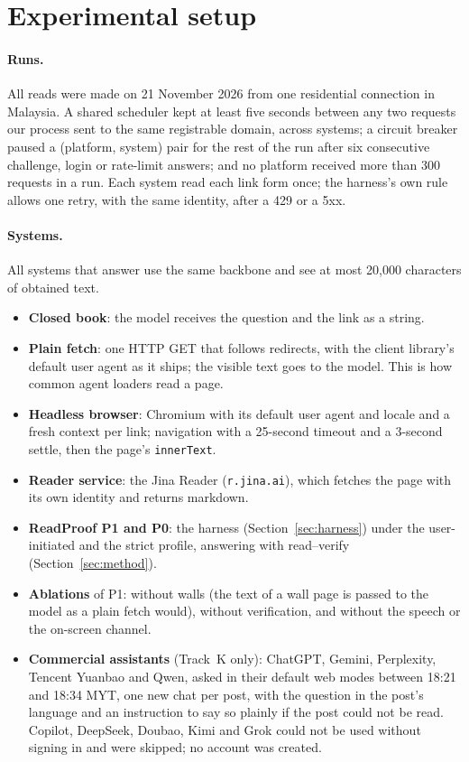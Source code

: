 \section{Experimental setup}\label{sec:setup}

\paragraph{Runs.}
All reads were made on 21 November 2026 from one residential connection in Malaysia. A shared scheduler kept at
least five seconds between any two requests our process sent to the same registrable domain, across systems; a
circuit breaker paused a (platform, system) pair for the rest of the run after six consecutive challenge, login or
rate-limit answers; and no platform received more than 300 requests in a run. Each system read each link form
once; the harness's own rule allows one retry, with the same identity, after a 429 or a 5xx.

\paragraph{Systems.}
All systems that answer use the same backbone and see at most 20{,}000 characters of obtained text.
\begin{itemize}[leftmargin=1.4em,itemsep=1pt]
\item \textbf{Closed book}: the model receives the question and the link as a string.
\item \textbf{Plain fetch}: one HTTP GET that follows redirects, with the client library's default user agent as
  it ships; the visible text goes to the model. This is how common agent loaders read a page.
\item \textbf{Headless browser}: Chromium with its default user agent and locale and a fresh context per link;
  navigation with a 25-second timeout and a 3-second settle, then the page's \texttt{innerText}.
\item \textbf{Reader service}: the Jina Reader (\texttt{r.jina.ai}), which fetches the page with its own identity
  and returns markdown.
\item \textbf{ReadProof P1 and P0}: the harness (Section~\ref{sec:harness}) under the user-initiated and the
  strict profile, answering with read--verify (Section~\ref{sec:method}).
\item \textbf{Ablations} of P1: without walls (the text of a wall page is passed to the model as a plain fetch
  would), without verification, and without the speech or the on-screen channel.
\item \textbf{Commercial assistants} (Track~K only): ChatGPT, Gemini, Perplexity, Tencent Yuanbao and Qwen, asked in
  their default web modes between 18:21 and 18:34 MYT, one new chat per post, with the question in the post's
  language and an instruction to say so plainly if the post could not be read. Copilot, DeepSeek, Doubao, Kimi and
  Grok could not be used without signing in and were skipped; no account was created.
\end{itemize}

